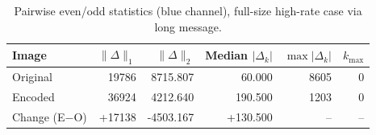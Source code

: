 
\begin{table}[H]\centering
\caption{Pairwise even/odd statistics (blue channel), full-size high-rate case via long message.}
\begin{tabular}{lrrrrr}
\toprule
Image & $\|\Delta\|_{1}$ & $\|\Delta\|_{2}$ & Median $|\Delta_k|$ & $\max |\Delta_k|$ & $k_{\max}$ \\
\midrule
Original & 19786 & 8715.807 & 60.000 & 8605 & 0 \\
Encoded  & 36924 & 4212.640 & 190.500 & 1203 & 0 \\
\midrule
Change (E$-$O) & +17138 & -4503.167 & +130.500 & -- & -- \\
\bottomrule
\end{tabular}
\end{table}
